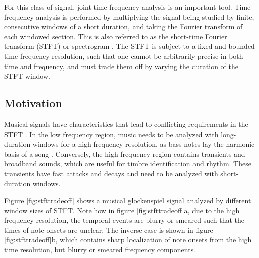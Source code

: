 \documentclass[letter,12pt,notitlepage]{article}
\begin{document}
For this class of signal, joint time-frequency analysis is an important tool. Time-frequency analysis is performed by multiplying the signal being studied by finite, consecutive windows of a short duration, and taking the Fourier transform of each windowed section. This is also referred to as the short-time Fourier transform (STFT) or spectrogram . The STFT is subject to a fixed and bounded time-frequency resolution, such that one cannot be arbitrarily precise in both time and frequency, and must trade them off by varying the duration of the STFT window.

\subsection{Motivation}

Musical signals have characteristics that lead to conflicting requirements in the STFT \cite{doerflerphd}. In the low frequency region, music needs to be analyzed with long-duration windows for a high frequency resolution, as bass notes lay the harmonic basis of a song . Conversely, the high frequency region contains transients and broadband sounds, which are useful for timbre identification and rhythm. These transients have fast attacks and decays and need to be analyzed with short-duration windows.

Figure \ref{fig:stfttradeoff} shows a musical glockenspiel signal analyzed by different window sizes of STFT. Note how in figure \ref{fig:stfttradeoff}a, due to the high frequency resolution, the temporal events are blurry or smeared such that the times of note onsets are unclear. The inverse case is shown in figure \ref{fig:stfttradeoff}b, which contains sharp localization of note onsets from the high time resolution, but blurry or smeared frequency components.
\end{document}
